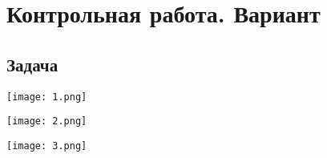 \section{Контрольная работа. Вариант }

\subsection{Задача }
\texttt{[image: 1.png]}

\newpage
\texttt{[image: 2.png]}

\newpage
\texttt{[image: 3.png]}
